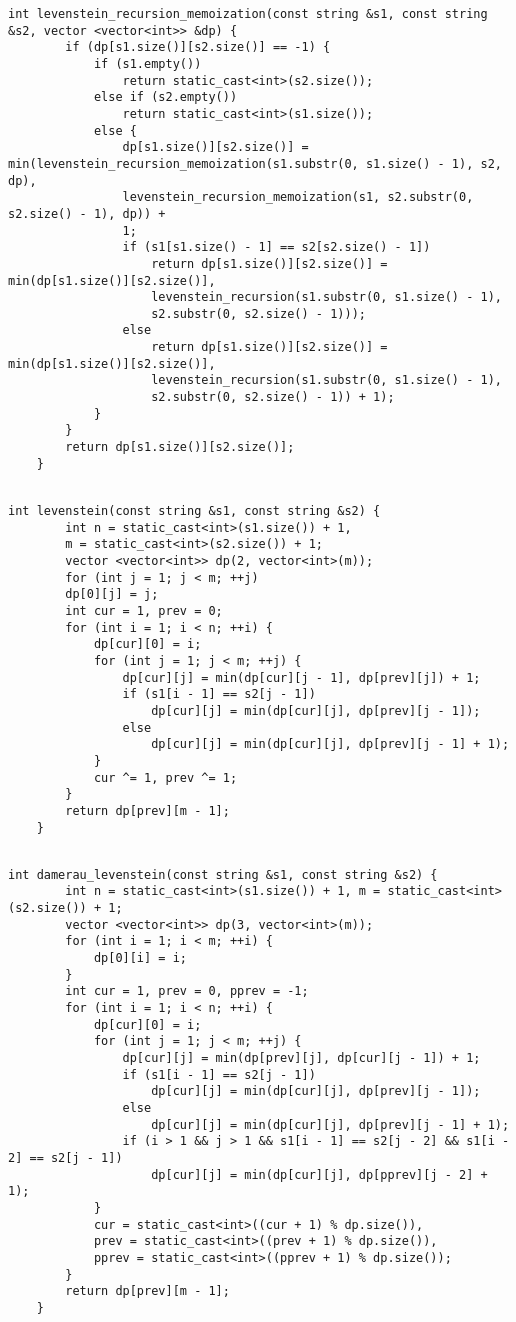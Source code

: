 \begin{lstlisting}[caption={Перегруженная функция рекурсивного поиска расстояния Левенштейна с мемоизацией}, label=lst:lev_rec_mem_2]
	int levenstein_recursion_memoization(const string &s1, const string &s2, vector <vector<int>> &dp) {
		if (dp[s1.size()][s2.size()] == -1) {
			if (s1.empty())
				return static_cast<int>(s2.size());
			else if (s2.empty())
				return static_cast<int>(s1.size());
			else {
				dp[s1.size()][s2.size()] = min(levenstein_recursion_memoization(s1.substr(0, s1.size() - 1), s2, dp),
				levenstein_recursion_memoization(s1, s2.substr(0, s2.size() - 1), dp)) +
				1;
				if (s1[s1.size() - 1] == s2[s2.size() - 1])
					return dp[s1.size()][s2.size()] = min(dp[s1.size()][s2.size()],
					levenstein_recursion(s1.substr(0, s1.size() - 1),
					s2.substr(0, s2.size() - 1)));
				else
					return dp[s1.size()][s2.size()] = min(dp[s1.size()][s2.size()],
					levenstein_recursion(s1.substr(0, s1.size() - 1),
					s2.substr(0, s2.size() - 1)) + 1);
			}
		}
		return dp[s1.size()][s2.size()];
	}
	
\end{lstlisting}
\clearpage
\begin{lstlisting}[caption={Функция нерекурсивного поиска расстояния Левенштейна}, label=lst:lev_iter]
	int levenstein(const string &s1, const string &s2) {
		int n = static_cast<int>(s1.size()) + 1,
		m = static_cast<int>(s2.size()) + 1;
		vector <vector<int>> dp(2, vector<int>(m));
		for (int j = 1; j < m; ++j)
		dp[0][j] = j;
		int cur = 1, prev = 0;
		for (int i = 1; i < n; ++i) {
			dp[cur][0] = i;
			for (int j = 1; j < m; ++j) {
				dp[cur][j] = min(dp[cur][j - 1], dp[prev][j]) + 1;
				if (s1[i - 1] == s2[j - 1])
					dp[cur][j] = min(dp[cur][j], dp[prev][j - 1]);
				else
					dp[cur][j] = min(dp[cur][j], dp[prev][j - 1] + 1);
			}
			cur ^= 1, prev ^= 1;
		}
		return dp[prev][m - 1];
	}
	
\end{lstlisting}
\begin{lstlisting}[caption={Функция нерекурсивного поиска расстояния Дамерау---Левенштейна}, label=lst:dam_lev_iter]
	int damerau_levenstein(const string &s1, const string &s2) {
		int n = static_cast<int>(s1.size()) + 1, m = static_cast<int>(s2.size()) + 1;
		vector <vector<int>> dp(3, vector<int>(m));
		for (int i = 1; i < m; ++i) {
			dp[0][i] = i;
		}
		int cur = 1, prev = 0, pprev = -1;
		for (int i = 1; i < n; ++i) {
			dp[cur][0] = i;
			for (int j = 1; j < m; ++j) {
				dp[cur][j] = min(dp[prev][j], dp[cur][j - 1]) + 1;
				if (s1[i - 1] == s2[j - 1])
					dp[cur][j] = min(dp[cur][j], dp[prev][j - 1]);
				else
					dp[cur][j] = min(dp[cur][j], dp[prev][j - 1] + 1);
				if (i > 1 && j > 1 && s1[i - 1] == s2[j - 2] && s1[i - 2] == s2[j - 1])
					dp[cur][j] = min(dp[cur][j], dp[pprev][j - 2] + 1);
			}
			cur = static_cast<int>((cur + 1) % dp.size()),
			prev = static_cast<int>((prev + 1) % dp.size()),
			pprev = static_cast<int>((pprev + 1) % dp.size());
		}
		return dp[prev][m - 1];
	}
	
\end{lstlisting}

